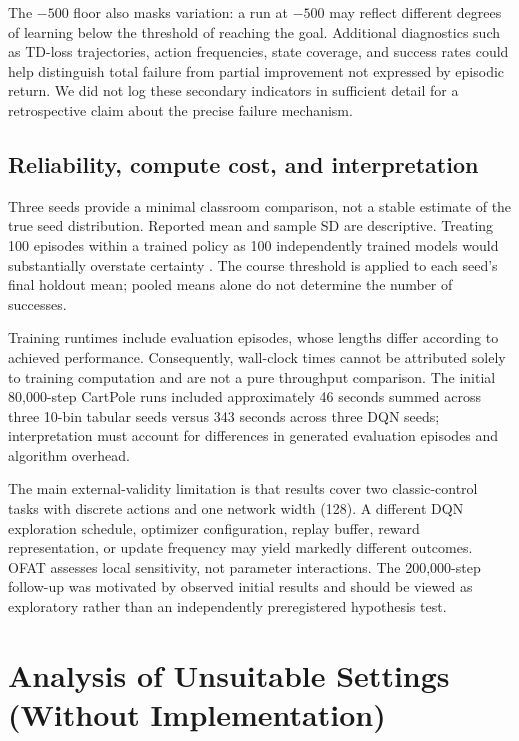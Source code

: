 \documentclass[conference,10pt]{IEEEtran}
\begin{document}
The $-500$ floor also masks variation: a run at $-500$ may reflect different degrees of learning below the threshold of reaching the goal. Additional diagnostics such as TD-loss trajectories, action frequencies, state coverage, and success rates could help distinguish total failure from partial improvement not expressed by episodic return. We did not log these secondary indicators in sufficient detail for a retrospective claim about the precise failure mechanism.

\subsection{Reliability, compute cost, and interpretation}
Three seeds provide a minimal classroom comparison, not a stable estimate of the true seed distribution. Reported mean and sample SD are descriptive. Treating 100 episodes within a trained policy as 100 independently trained models would substantially overstate certainty \cite{Henderson2018}. The course threshold is applied to each seed's final holdout mean; pooled means alone do not determine the number of successes.

Training runtimes include evaluation episodes, whose lengths differ according to achieved performance. Consequently, wall-clock times cannot be attributed solely to training computation and are not a pure throughput comparison. The initial 80,000-step CartPole runs included approximately 46 seconds summed across three 10-bin tabular seeds versus 343 seconds across three DQN seeds; interpretation must account for differences in generated evaluation episodes and algorithm overhead.

The main external-validity limitation is that results cover two classic-control tasks with discrete actions and one network width (128). A different DQN exploration schedule, optimizer configuration, replay buffer, reward representation, or update frequency may yield markedly different outcomes. OFAT assesses local sensitivity, not parameter interactions. The 200,000-step follow-up was motivated by observed initial results and should be viewed as exploratory rather than an independently preregistered hypothesis test.

\section{Analysis of Unsuitable Settings (Without Implementation)}
\end{document}
